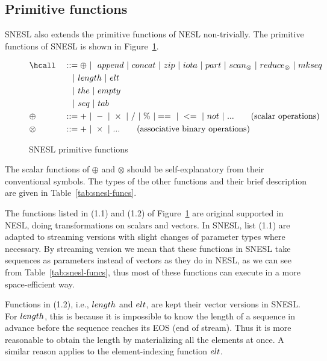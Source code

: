 \subsection{Primitive functions}

SNESL also extends the primitive functions of NESL non-trivially.
The primitive functions of SNESL is shown in Figure~\ref{fig-snesl-func}.

\begin{figure}[h]\large
\begin{alignat}{2} 
&\hcall && ::= \oplus \ | \ \ \*{append} \ | \ \*{concat} \ | \ \*{zip} \ | \ \*{iota}  \ | \ \*{part}  \ | \ \*{scan}_{\otimes} \ | \ \*{reduce}_{\otimes} \ | \ \*{mkseq} \\
&   && \quad | \ \*{length} \ | \ \*{elt} \\
&   && \quad | \ \*{the}  \ | \ \*{empty} \\
&   && \quad | \ \*{seq} \ | \ \*{tab} \\
& \oplus  \ && :: = + \ | \ - \ | \ \times \ |  \  / \ | \ \% \ | ==  \ |\ <=  \ | \ \*{not} \ | \ ... \tag{scalar operations} \\
& \otimes \ && :: = + \ | \ \times  \ | \ ...  \tag{associative binary operations}
\end{alignat}
\caption{SNESL primitive functions \label{fig-snesl-func}}
\end{figure}

The scalar functions of $\oplus$ and $\otimes$ should be self-explanatory from their conventional symbols. 
The types of the other functions and their brief description are given in Table~\ref{tab:snesl-funcs}.

The functions listed in (1.1) and (1.2) of Figure~\ref{fig-snesl-func} are original supported in NESL, doing transformations on scalars and vectors.
In SNESL, list (1.1) are adapted to streaming versions with slight changes of parameter types where necessary.
By streaming version we mean that these functions in SNESL take sequences as parameters instead of vectors as they do in NESL, as we can see from Table~\ref{tab:snesl-funcs}, thus most of these functions can execute in a more space-efficient way.  

Functions in (1.2), i.e., $\*{length}$ and $\*{elt}$, are kept their vector versions in SNESL. 
For $\*{length}$, this is because it is impossible to know the length of a sequence in advance before the sequence reaches its EOS (end of stream).
Thus it is more reasonable to obtain the length by materializing all the elements at once. 
A similar reason applies to the element-indexing function $\*{elt}$.

